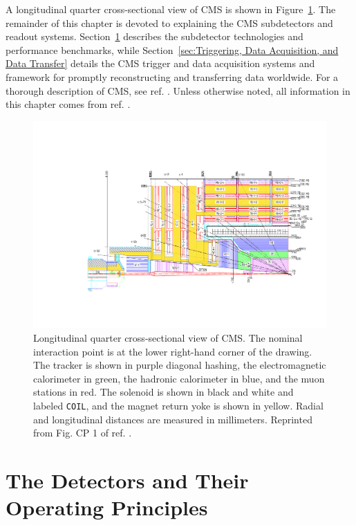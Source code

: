 \documentclass[dissertation.tex]{subfiles}
\begin{document}
A longitudinal quarter cross-sectional view of CMS is shown in Figure~\ref{fig:CMS_longitudinal_xsec}.  The remainder of this chapter is devoted to explaining the CMS subdetectors and readout systems.  Section~\ref{sec:The Detectors and Their Operating Principles} describes the subdetector technologies and performance benchmarks, while Section~\ref{sec:Triggering, Data Acquisition, and Data Transfer} details the CMS trigger and data acquisition systems and framework for promptly reconstructing and transferring data worldwide.  For a thorough description of CMS, see ref. \cite{1748-0221-3-08-S08004}.  Unless otherwise noted, all information in this chapter comes from ref. \cite{1748-0221-3-08-S08004}.

\begin{figure}
	\centering
	\includegraphics[scale=0.5]{CMS_longitudinal_xsec}
	\caption{Longitudinal quarter cross-sectional view of CMS.  The nominal interaction point is at the lower right-hand corner of the drawing.  The tracker is shown in purple diagonal hashing, the electromagnetic calorimeter in green, the hadronic calorimeter in blue, and the muon stations in red.  The solenoid is shown in black and white and labeled \texttt{COIL}, and the magnet return yoke is shown in yellow.  Radial and longitudinal distances are measured in millimeters.  Reprinted from Fig. CP 1 of ref. \cite{Bayatian:922757}.}
	\label{fig:CMS_longitudinal_xsec}
\end{figure}

\section{The Detectors and Their Operating Principles}
\label{sec:The Detectors and Their Operating Principles}
\end{document}
